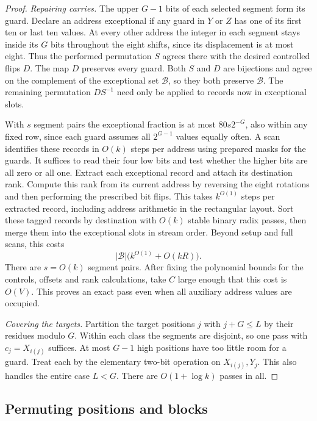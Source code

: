 \begin{proof}
\emph{Repairing carries.}
The upper $G-1$ bits of each selected segment form its guard.
Declare an address exceptional if any guard in $Y$ or $Z$ has one of
its first ten or last ten values. At every other address the integer
in each segment stays inside its $G$ bits throughout the eight shifts,
since its displacement is at most eight. Thus the performed permutation
$S$ agrees there with the desired controlled flips $D$. The map $D$
preserves every guard. Both $S$ and $D$ are bijections and agree on the
complement of the exceptional set $\mathcal B$, so they both preserve
$\mathcal B$. The remaining permutation $DS^{-1}$ need only be applied
to records now in exceptional slots.

With $s$ segment pairs the exceptional fraction is at most
$80s2^{-G}$, also within any fixed row, since each guard assumes all
$2^{G-1}$ values equally often. A scan identifies these records in
$O(k)$ steps per address using prepared masks for the guards. It
suffices to read their four low bits and test whether the higher bits
are all zero or all one. Extract each exceptional record and attach
its destination rank. Compute this rank from its current address by
reversing the eight rotations and then performing the prescribed bit
flips. This takes $k^{O(1)}$ steps per extracted record, including
address arithmetic in the rectangular layout. Sort these tagged
records by destination with $O(k)$ stable binary radix passes, then
merge them into the exceptional slots in stream order. Beyond setup
and full scans, this costs
\[
             |\mathcal B|\bigl(k^{O(1)}+O(kR)\bigr).
\]
There are $s=O(k)$ segment pairs. After fixing the polynomial bounds
for the controls, offsets and rank calculations, take $C$ large enough
that this cost is $O(V)$. This proves an exact pass even when all
auxiliary address values are occupied.

\emph{Covering the targets.}
Partition the target positions $j$ with $j+G\le L$ by their residues
modulo $G$. Within each class the segments are disjoint, so one pass
with $c_j=X_{i(j)}$ suffices. At most $G-1$ high positions have too
little room for a guard. Treat each by the elementary two-bit operation
on $X_{i(j)},Y_j$. This also handles the entire case $L<G$. There are
$O(1+\log k)$ passes in all.
\end{proof}

\subsection{Permuting positions and blocks}

